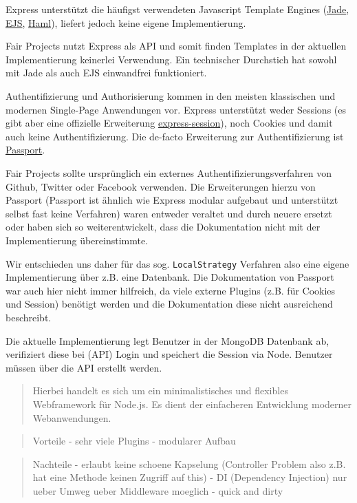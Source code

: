 Express unterstützt die häufigst verwendeten Javascript Template Engines
(\href{http://github.com/visionmedia/jade}{Jade},
\href{http://github.com/visionmedia/ejs}{EJS},
\href{http://github.com/visionmedia/haml.js}{Haml}), liefert jedoch
keine eigene Implementierung.

Fair Projects nutzt Express als API und somit finden Templates in der
aktuellen Implementierung keinerlei Verwendung. Ein technischer
Durchstich hat sowohl mit Jade als auch EJS einwandfrei funktioniert.

Authentifizierung und Authorisierung kommen in den meisten klassischen
und modernen Single-Page Anwendungen vor. Express unterstützt weder
Sessions (es gibt aber eine offizielle Erweiterung
\href{https://github.com/expressjs/session}{express-session}), noch
Cookies und damit auch keine Authentifizierung. Die de-facto Erweiterung
zur Authentifizierung ist \href{http://passportjs.org/}{Passport}.

Fair Projects sollte ursprünglich ein externes
Authentifizierungsverfahren von Github, Twitter oder Facebook verwenden.
Die Erweiterungen hierzu von Passport (Passport ist ähnlich wie Express
modular aufgebaut und unterstützt selbst fast keine Verfahren) waren
entweder veraltet und durch neuere ersetzt oder haben sich so
weiterentwickelt, dass die Dokumentation nicht mit der Implementierung
übereinstimmte.

Wir entschieden uns daher für das sog. \texttt{LocalStrategy} Verfahren
also eine eigene Implementierung über z.B. eine Datenbank. Die
Dokumentation von Passport war auch hier nicht immer hilfreich, da viele
externe Plugins (z.B. für Cookies und Session) benötigt werden und die
Dokumentation diese nicht ausreichend beschreibt.

Die aktuelle Implementierung legt Benutzer in der MongoDB Datenbank ab,
verifiziert diese bei (API) Login und speichert die Session via Node.
Benutzer müssen über die API erstellt werden.

\begin{quote}
Hierbei handelt es sich um ein minimalistisches und flexibles
Webframework für Node.js. Es dient der einfacheren Entwicklung moderner
Webanwendungen.
\end{quote}

\begin{quote}
Vorteile - sehr viele Plugins - modularer Aufbau
\end{quote}

\begin{quote}
Nachteile - erlaubt keine schoene Kapselung (Controller Problem also
z.B. hat eine Methode keinen Zugriff auf this) - DI (Dependency
Injection) nur ueber Umweg ueber Middleware moeglich - quick and dirty
\end{quote}